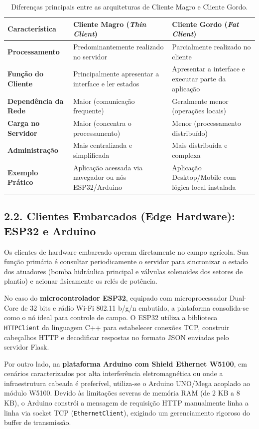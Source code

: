 \begin{table}[h!]
\centering
\fontsize{10}{12}\selectfont
\caption{Diferenças principais entre as arquiteturas de Cliente Magro e Cliente Gordo.}
\begin{tabular}{|p{3.5cm}|p{4.5cm}|p{4.5cm}|}
\hline
\textbf{Característica} & \textbf{Cliente Magro (\textit{Thin Client})} & \textbf{Cliente Gordo (\textit{Fat Client})} \\ \hline
\textbf{Processamento} & Predominantemente realizado no servidor & Parcialmente realizado no cliente \\ \hline
\textbf{Função do Cliente} & Principalmente apresentar a interface e ler estados & Apresentar a interface e executar parte da aplicação \\ \hline
\textbf{Dependência da Rede} & Maior (comunicação frequente) & Geralmente menor (operações locais) \\ \hline
\textbf{Carga no Servidor} & Maior (concentra o processamento) & Menor (processamento distribuído) \\ \hline
\textbf{Administração} & Mais centralizada e simplificada & Mais distribuída e complexa \\ \hline
\textbf{Exemplo Prático} & Aplicação acessada via navegador ou nós ESP32/Arduino & Aplicação Desktop/Mobile com lógica local instalada \\ \hline
\end{tabular}
\end{table}

\subsection*{2.2. Clientes Embarcados (Edge Hardware): ESP32 e Arduino}

Os clientes de hardware embarcado operam diretamente no campo agrícola. Sua função primária é consultar periodicamente o servidor para sincronizar o estado dos atuadores (bomba hidráulica principal e válvulas solenoides dos setores de plantio) e acionar fisicamente os relés de potência.

No caso do \textbf{microcontrolador ESP32}, equipado com microprocessador Dual-Core de 32 bits e rádio Wi-Fi 802.11 b/g/n embutido, a plataforma consolida-se como o nó ideal para controle de campo. O ESP32 utiliza a biblioteca \texttt{HTTPClient} da linguagem C++ para estabelecer conexões TCP, construir cabeçalhos HTTP e decodificar respostas no formato JSON enviadas pelo servidor Flask.

Por outro lado, na \textbf{plataforma Arduino com Shield Ethernet W5100}, em cenários caracterizados por alta interferência eletromagnética ou onde a infraestrutura cabeada é preferível, utiliza-se o Arduino UNO/Mega acoplado ao módulo W5100. Devido às limitações severas de memória RAM (de 2 KB a 8 KB), o Arduino constrói a mensagem de requisição HTTP manualmente linha a linha via socket TCP (\texttt{EthernetClient}), exigindo um gerenciamento rigoroso do buffer de transmissão.

